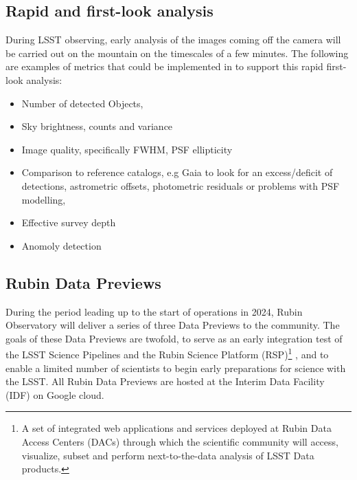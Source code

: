 \subsection{Rapid and first-look analysis} \label{ssec:rapid}

During LSST observing, early analysis of the images coming off the camera will be carried out on the mountain on the timescales of a few minutes. 
The following are examples of metrics that could be implemented in \faro to support this rapid first-look analysis:
\begin{itemize}
\item Number of detected Objects,
\item Sky brightness, counts and variance 
\item Image quality, specifically FWHM, PSF ellipticity
\item Comparison to reference catalogs, e.g Gaia to look for an excess/deficit of detections, astrometric offsets, photometric residuals or problems with PSF modelling,
\item Effective survey depth
\item Anomoly detection
\end{itemize}

\subsection{Rubin Data Previews} \label{ssec:datapreviews}

During the period leading up to the start of operations in 2024, Rubin Observatory will deliver a series of three Data Previews to the community. 
The goals of these Data Previews are twofold, to serve as an early integration test of the LSST Science Pipelines and the Rubin Science Platform (RSP)\footnote{A set of integrated web applications and services deployed at Rubin Data Access Centers (DACs) through which the scientific community will access, visualize, subset and perform next-to-the-data analysis of LSST Data products.} \cite{lse-319}, and to enable a limited number of scientists to begin early preparations for science with the LSST.
All  Rubin Data Previews are hosted at the Interim Data Facility (IDF) on Google cloud\cite{2021arXiv211115030O}.

